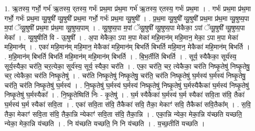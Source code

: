 \documentclass[17pt]{extarticle}
\begin{document}
1. ऋ॒तस्य॒ गर्भो॒ गर्भ॑ ऋ॒तस्य॒ र्‌तस्य॒ गर्भः॑ प्रथ॒मा प्र॑थ॒मा गर्भ॑ ऋ॒तस्य॒ र्‌तस्य॒ गर्भः॑ प्रथ॒मा । . गर्भः॑ प्रथ॒मा प्र॑थ॒मा गर्भो॒ गर्भः॑ प्रथ॒मा व्यू॒षुषी᳚ व्यू॒षुषी᳚ प्रथ॒मा गर्भो॒ गर्भः॑ प्रथ॒मा व्यू॒षुषी᳚ । . प्र॒थ॒मा व्यू॒षुषी᳚ व्यू॒षुषी᳚ प्रथ॒मा प्र॑थ॒मा व्यू॒षुष्य॒पा म॒पां ॅव्यू॒षुषी᳚ प्रथ॒मा प्र॑थ॒मा व्यू॒षुष्य॒पाम् । . व्यू॒षुष्य॒पा म॒पां ॅव्यू॒षुषी᳚ व्यू॒षुष्य॒पा मेकैका॒ ऽपां ॅव्यू॒षुषी᳚ व्यू॒षुष्य॒पा मेका᳚ । . व्यू॒षुषीति॑ वि - ऊ॒षुषी᳚ । . अ॒पा मेकैका॒ ऽपा म॒पा मेका॑ महि॒मान॑म् महि॒मान॒ मेका॒ ऽपा म॒पा मेका॑ महि॒मान᳚म् । . एका॑ महि॒मान॑म् महि॒मान॒ मेकैका॑ महि॒मान॑म् बिभर्ति बिभर्ति महि॒मान॒ मेकैका॑ महि॒मान॑म् बिभर्ति । . म॒हि॒मान॑म् बिभर्ति बिभर्ति महि॒मान॑म् महि॒मान॑म् बिभर्ति । . बि॒भ॒र्तीति॑ बिभर्ति । . सूर्य॒ स्यैकैका॒ सूर्य॑स्य॒ सूर्य॒स्यैका॒ चर॑ति॒ चर॒त्येका॒ सूर्य॑स्य॒ सूर्य॒ स्यैका॒ चर॑ति । . एका॒ चर॑ति॒ चर॒ त्येकैका॒ चर॑ति निष्कृ॒तेषु॑ निष्कृ॒तेषु॒ चर॒ त्येकैका॒ चर॑ति निष्कृ॒तेषु॑ । . चर॑ति निष्कृ॒तेषु॑ निष्कृ॒तेषु॒ चर॑ति॒ चर॑ति निष्कृ॒तेषु॑ घ॒र्मस्य॑ घ॒र्मस्य॑ निष्कृ॒तेषु॒ चर॑ति॒ चर॑ति निष्कृ॒तेषु॑ घ॒र्मस्य॑ । . नि॒ष्कृ॒तेषु॑ घ॒र्मस्य॑ घ॒र्मस्य॑ निष्कृ॒तेषु॑ निष्कृ॒तेषु॑ घ॒र्मस्यैकैका॑ घ॒र्मस्य॑ निष्कृ॒तेषु॑ निष्कृ॒तेषु॑ घ॒र्मस्यैका᳚ । . नि॒ष्कृ॒तेष्विति॑ निः - कृ॒तेषु॑ । . घ॒र्म स्यैकैका॑ घ॒र्मस्य॑ घ॒र्म स्यैका॑ सवि॒ता स॑वि॒ तैका॑ घ॒र्मस्य॑ घ॒र्म स्यैका॑ सवि॒ता । . एका॑ सवि॒ता स॑वि॒ तैकैका॑ सवि॒ तैका॒ मेकाꣳ॑ सवि॒ तैकैका॑ सवि॒तैका᳚म् । . स॒वि॒ तैका॒ मेकाꣳ॑ सवि॒ता स॑वि॒ तैका॒न्नि न्येकाꣳ॑ सवि॒ता स॑वि॒ तैका॒न्नि । . एका॒न्नि न्येका॒ मेका॒न्नि य॑च्छति यच्छति॒ न्येका॒ मेका॒न्नि य॑च्छति । . नि य॑च्छति यच्छति॒ नि नि य॑च्छति । . य॒च्छ॒तीति॑ यच्छति । \newline
\end{document}
